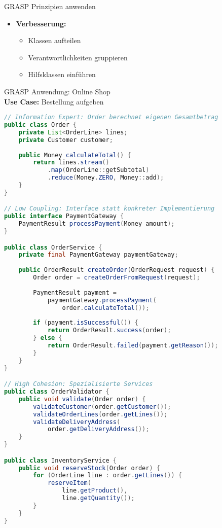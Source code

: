 \begin{KR}{GRASP Prinzipien anwenden}
\begin{itemize}
    \item \textbf{Verbesserung:}
    \begin{itemize}
        \item Klassen aufteilen
        \item Verantwortlichkeiten gruppieren
        \item Hilfsklassen einführen
    \end{itemize}
\end{itemize}
\end{KR}

\begin{example2}{GRASP Anwendung: Online Shop}\\
\textbf{Use Case:} Bestellung aufgeben

\begin{lstlisting}[language=Java, style=basesmol]
// Information Expert: Order berechnet eigenen Gesamtbetrag
public class Order {
    private List<OrderLine> lines;
    private Customer customer;
    
    public Money calculateTotal() {
        return lines.stream()
            .map(OrderLine::getSubtotal)
            .reduce(Money.ZERO, Money::add);
    }
}

// Low Coupling: Interface statt konkreter Implementierung
public interface PaymentGateway {
    PaymentResult processPayment(Money amount);
}

public class OrderService {
    private final PaymentGateway paymentGateway;
    
    public OrderResult createOrder(OrderRequest request) {
        Order order = createOrderFromRequest(request);
        
        PaymentResult payment = 
            paymentGateway.processPayment(
                order.calculateTotal());
                
        if (payment.isSuccessful()) {
            return OrderResult.success(order);
        } else {
            return OrderResult.failed(payment.getReason());
        }
    }
}

// High Cohesion: Spezialisierte Services
public class OrderValidator {
    public void validate(Order order) {
        validateCustomer(order.getCustomer());
        validateOrderLines(order.getLines());
        validateDeliveryAddress(
            order.getDeliveryAddress());
    }
}

public class InventoryService {
    public void reserveStock(Order order) {
        for (OrderLine line : order.getLines()) {
            reserveItem(
                line.getProduct(), 
                line.getQuantity());
        }
    }
}
\end{lstlisting}
\end{example2}

